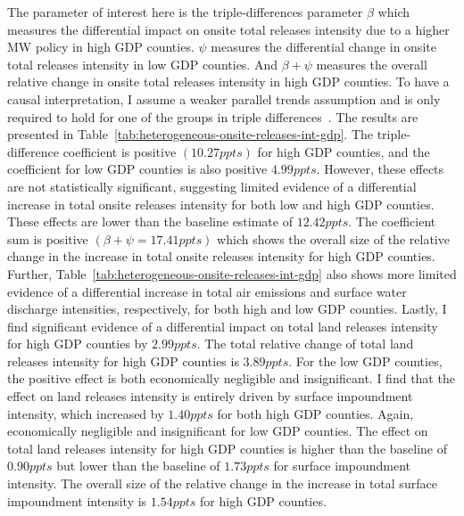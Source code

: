 \documentclass[12pt, english]{article}
\begin{document}
    The parameter of interest here is the triple-differences parameter $\beta$ which measures the differential impact on onsite total releases intensity due to a higher MW policy in high GDP counties. $\psi$ measures the differential change in onsite total releases intensity in low GDP counties. And $\beta + \psi$ measures the overall relative change in onsite total releases intensity in high GDP counties. To have a causal interpretation, I assume a weaker parallel trends assumption and is only required to hold for one of the groups in triple differences~\parencite{olden2022triple}. The results are presented in Table~\ref{tab:heterogeneous-onsite-releases-int-gdp}. The triple-difference coefficient is positive $(10.27ppts)$ for high GDP counties, and the coefficient for low GDP counties is also positive $4.99ppts$. However, these effects are not statistically significant, suggesting limited evidence of a differential increase in total onsite releases intensity for both low and high GDP counties. These effects are lower than the baseline estimate of $12.42ppts$. The coefficient sum is positive $(\beta + \psi = 17.41ppts)$ which shows the overall size of the relative change in the increase in total onsite releases intensity for high GDP counties. Further, Table~\ref{tab:heterogeneous-onsite-releases-int-gdp} also shows more limited evidence of a differential increase in total air emissions and surface water discharge intensities, respectively, for both high and low GDP counties. Lastly, I find significant evidence of a differential impact on total land releases intensity for high GDP counties by $2.99ppts$. The total relative change of total land releases intensity for high GDP counties is $3.89ppts$. For the low GDP counties, the positive effect is both economically negligible and insignificant. I find that the effect on land releases intensity is entirely driven by surface impoundment intensity, which increased by $1.40ppts$ for both high GDP counties. Again, economically negligible and insignificant for low GDP counties. The effect on total land releases intensity for high GDP counties is higher than the baseline of $0.90ppts$ but lower than the baseline of $1.73ppts$ for surface impoundment intensity. The overall size of the relative change in the increase in total surface impoundment intensity is $1.54ppts$ for high GDP counties.
    
\end{document}
